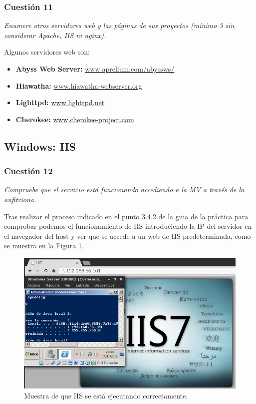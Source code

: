 \subsubsection{Cuestión 11}
\textit{Enumere otros servidores web y las páginas de sus proyectos (mínimo 3 sin considerar Apache, IIS ni nginx).}
\newline

Algunos servidores web son:
\begin{itemize}
  \item \textbf{Abyss Web Server: } \url{www.aprelium.com/abyssws/}
  \item \textbf{Hiawatha: } \url{www.hiawatha-webserver.org}
  \item \textbf{Lighttpd: } \url{www.lighttpd.net}
  \item \textbf{Cherokee: } \url{www.cherokee-project.com}
\end{itemize}






\subsection{Windows: IIS}
\subsubsection{Cuestión 12}
\textit{Compruebe que el servicio está funcionando accediendo a la MV a través de la anfitriona.}
\newline

Tras realizar el proceso indicado en el punto 3.4.2 de la guia de la práctica para comprobar podemos  el funcionamiento de IIS introduciendo la IP del servidor en el navegador del host y ver que se accede a un web de IIS predeterminada, como se muestra en la Figura \ref{fig20}.

\begin{figure}[H]
    \begin{center}
        \includegraphics[scale=0.5]{imagenes/img20}
        \caption{Muestra de que IIS se está ejecutando correctamente.}
        \label{fig20}
    \end{center}
\end{figure}

